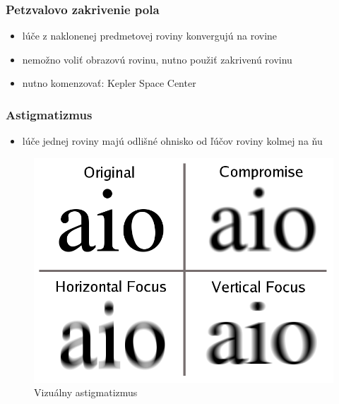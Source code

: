 \documentclass[10pt,xcolor=pdflatex]{beamer}
\begin{document}
\begin{frame}\frametitle{Petzvalovo zakrivenie pola}
    \begin{itemize}
        \item lúče z naklonenej predmetovej roviny konvergujú na rovine 
        \item nemožno voliť obrazovú rovinu, nutno použiť zakrivenú rovinu
        \item nutno komenzovať: Kepler Space Center
    \end{itemize}
\end{frame}

\begin{frame}\frametitle{Astigmatizmus}
    \begin{itemize}
        \item lúče jednej roviny majú odlišné ohnisko od ľúčov roviny kolmej na ňu
    \end{itemize}
    \begin{figure}
        \includegraphics[scale=0.20]{img/astigmatism.png}
        \caption{Vizuálny astigmatizmus}
    \end{figure}
\end{frame}
\end{document}
